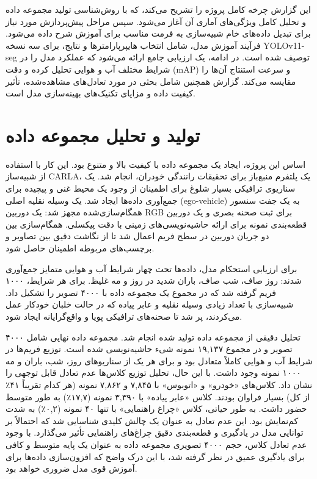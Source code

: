 \documentclass[oneside]{report}
\begin{document}
این گزارش چرخه کامل پروژه را تشریح می‌کند، که با روش‌شناسی تولید مجموعه داده و تحلیل کامل ویژگی‌های آماری آن آغاز می‌شود. سپس مراحل پیش‌پردازش مورد نیاز برای تبدیل داده‌های خام شبیه‌سازی به فرمت مناسب برای آموزش شرح داده می‌شود. فرآیند آموزش مدل، شامل انتخاب هایپرپارامترها و نتایج، برای سه نسخه YOLOv11-seg توصیف شده است. در ادامه، یک ارزیابی جامع ارائه می‌شود که عملکرد مدل را در شرایط مختلف آب و هوایی تحلیل کرده و دقت (mAP) و سرعت استنتاج آن‌ها را مقایسه می‌کند. گزارش همچنین شامل بحثی در مورد تعادل‌های مشاهده‌شده، تأثیر کیفیت داده و مزایای تکنیک‌های بهینه‌سازی مدل است.

\chapter{تولید و تحلیل مجموعه داده}
اساس این پروژه، ایجاد یک مجموعه داده با کیفیت بالا و متنوع بود. این کار با استفاده از شبیه‌ساز CARLA، یک پلتفرم منبع‌باز برای تحقیقات رانندگی خودران، انجام شد. یک سناریوی ترافیکی بسیار شلوغ برای اطمینان از وجود یک محیط غنی و پیچیده برای جمع‌آوری داده‌ها ایجاد شد. یک وسیله نقلیه اصلی (ego-vehicle) به یک جفت سنسور همگام‌سازی‌شده مجهز شد: یک دوربین RGB برای ثبت صحنه بصری و یک دوربین قطعه‌بندی نمونه برای ارائه حاشیه‌نویسی‌های زمینی  با دقت پیکسلی. همگام‌سازی بین دو جریان دوربین در سطح فریم اعمال شد تا از نگاشت دقیق بین تصاویر و برچسب‌های مربوطه اطمینان حاصل شود.

برای ارزیابی استحکام مدل، داده‌ها تحت چهار شرایط آب و هوایی متمایز جمع‌آوری شدند: روز صاف، شب صاف، باران شدید در روز و مه غلیظ. برای هر شرایط، ۱۰۰۰ فریم گرفته شد که در مجموع یک مجموعه داده با ۴۰۰۰ تصویر را تشکیل داد. شبیه‌سازی با تعداد زیادی وسیله نقلیه و عابر پیاده که در حالت خلبان خودکار عمل می‌کردند، پر شد تا صحنه‌های ترافیکی پویا و واقع‌گرایانه ایجاد شود.

تحلیل دقیقی از مجموعه داده تولید شده انجام شد. مجموعه داده نهایی شامل ۴۰۰۰ تصویر و در مجموع ۱۹,۱۳۷ نمونه شیء حاشیه‌نویسی شده است. توزیع فریم‌ها در شرایط آب و هوایی کاملاً متعادل بود و برای هر یک از سناریوهای روز، شب، باران و مه ۱۰۰۰ نمونه وجود داشت. با این حال، تحلیل توزیع کلاس‌ها عدم تعادل قابل توجهی را نشان داد. کلاس‌های «خودرو» و «اتوبوس» با ۷,۸۴۵ و ۷,۸۶۲ نمونه (هر کدام تقریباً ۴۱٪ از کل) بسیار فراوان بودند. کلاس «عابر پیاده» با ۳,۳۹۰ نمونه (۱۷,۷٪) به طور متوسط حضور داشت. به طور حیاتی، کلاس «چراغ راهنمایی» با تنها ۴۰ نمونه (۰,۲٪) به شدت کم‌نمایش بود. این عدم تعادل به عنوان یک چالش کلیدی شناسایی شد که احتمالاً بر توانایی مدل در یادگیری و قطعه‌بندی دقیق چراغ‌های راهنمایی تأثیر می‌گذارد. با وجود عدم تعادل کلاس، حجم ۴۰۰۰ تصویری مجموعه داده به عنوان یک پایه متوسط و کافی برای یادگیری عمیق در نظر گرفته شد، با این درک واضح که افزون‌سازی داده‌ها برای آموزش قوی مدل ضروری خواهد بود.
\end{document}
